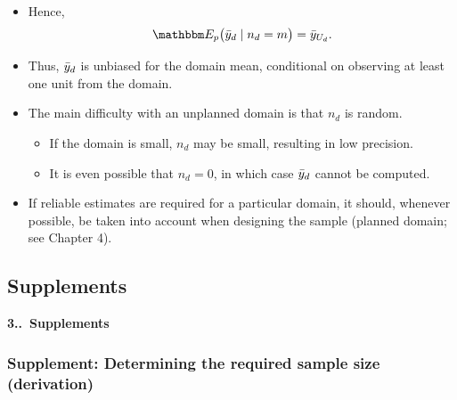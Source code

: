 \documentclass{my_eth_beamer}
\numberwithin{equation}{section}
\newcommand{\NR}{3}
\begin{document}
\begin{frame}
    \begin{itemize}
    \setlength{\itemsep}{12pt}
        \item Hence,
            \begin{equation*}
                \EE\big(\widebar{y}_d \mid n_d = m\big) =
                    \widebar{y}_{U_d}.
            \end{equation*}
        \item Thus, $\bar{y}_d$ is unbiased for the domain mean,
            \alert{conditional} on observing at least one unit from the domain.
        \item The main difficulty with an \alert{unplanned domain} is that
            $n_d$ is random.
            \vspace{0.25em}
            \begin{itemize}
            \setlength{\itemsep}{8pt}
                \item If the domain is small, $n_d$ may be small, resulting in
                    \alert{low precision}.
                \item It is even possible that $n_d = 0$, in which case
                    $\bar{y}_d$ cannot be computed.
            \end{itemize}
        \item If reliable estimates are required for a particular domain, it
            should, whenever possible, be taken into account when designing the
            sample (\alert{planned domain}; see Chapter 4).
    \end{itemize}
\end{frame}


\subsection{Supplements}\label{sec:supplements}

\begin{frame}
    \begin{center}
        \Huge{\textbf{\NR.\insertsubsectionnumber.~Supplements}}
    \end{center}
\end{frame}

\subsubsection{Supplement: Determining the required sample size (derivation)}
\end{document}
